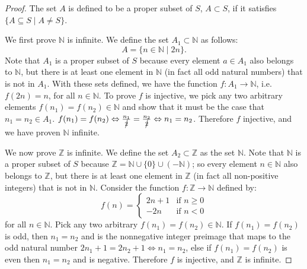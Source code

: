 \documentclass[11pt,twoside, reqno, align]{amsart}
\theoremstyle{remark}
\def\N{\mathbb N}
\def\Z{\mathbb Z}
\renewcommand{\iff}{\Leftrightarrow}
\begin{document}
\begin{proof}
The set $A$ is defined to be a proper subset of $S$, $A \subset S$, if it satisfies $\{A \subseteq S \mid A \neq S\}$.

We first prove $\N$ is infinite. We define the set $A_1 \subset \N$ as follows:
$$
A = \{n \in \N \mid 2n\}.
$$
Note that $A_1$ is a proper subset of $S$ because every element $a \in A_1$ also belongs to $\N$, but there is at least one element in $\N$ (in fact all odd natural numbers) that is not in $A_1$. With these sets defined, we have the function $f: A_1 \to \N$, i.e. $f(2n) = n$, for all $n \in \N$. To prove $f$ is injective, we pick any two arbitrary elements $f(n_1) = f(n_2) \in \N$ and show that it must be the case that $n_1 = n_2 \in A_1$. $f(n_1) = f(n_2) \iff \frac{n_1}{\cancel{2}} = \frac{n_2}{\cancel{2}} \iff n_1 = n_2$. Therefore $f$ injective, and we have proven $\N$ infinite. 

We now prove $\Z$ is infinite. We define the set $A_2 \subset \Z$ as the set $\N$. Note that $\N$ is a proper subset of $S$ because $\Z = \N \cup \{0\} \cup (-\N)$; so every element $n \in \N$ also belongs to $\Z$, but there is at least one element in $\Z$ (in fact all non-positive integers) that is not in $\N$. Consider the function $f: \Z \to \N$ defined by:
$$
f(n) = 
\begin{cases}
    2n+1 & \text{if $n \geq 0$} \\
    -2n & \text{if $n < 0$}
\end{cases}
$$
for all $n \in \N$. Pick any two arbitrary $f(n_1) = f(n_2) \in \N$. If $f(n_1) = f(n_2)$ is odd, then $n_1 = n_2$ and is the nonnegative integer preimage that maps to the odd natural number $2n_1+1 = 2n_2+1 \iff n_1 = n_2$, else if $f(n_1) = f(n_2)$ is even then $n_1 = n_2$ and is negative. Therefore $f$ is injective, and $\Z$ is infinite.


\end{proof}
\end{document}
